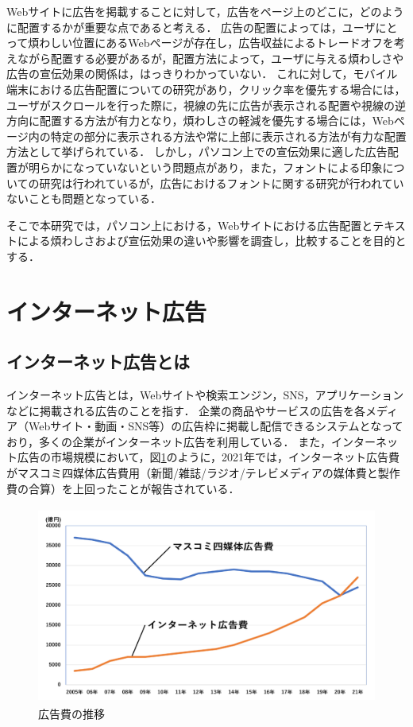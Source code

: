 \documentclass[12pt,a4j,titlepage]{ltjsarticle}
\begin{document}
Webサイトに広告を掲載することに対して，広告をページ上のどこに，どのように配置するかが重要な点であると考える．
広告の配置によっては，ユーザにとって煩わしい位置にあるWebページが存在し，広告収益によるトレードオフを考えながら配置する必要があるが，配置方法によって，ユーザに与える煩わしさや広告の宣伝効果の関係は，はっきりわかっていない．
これに対して，モバイル端末における広告配置についての研究があり，クリック率を優先する場合には，ユーザがスクロールを行った際に，視線の先に広告が表示される配置や視線の逆方向に配置する方法が有力となり，煩わしさの軽減を優先する場合には，Webページ内の特定の部分に表示される方法や常に上部に表示される方法が有力な配置方法として挙げられている\cite{mobile}．
しかし，パソコン上での宣伝効果に適した広告配置が明らかになっていないという問題点があり，また，フォントによる印象についての研究は行われているが，広告におけるフォントに関する研究が行われていないことも問題となっている．

そこで本研究では，パソコン上における，Webサイトにおける広告配置とテキストによる煩わしさおよび宣伝効果の違いや影響を調査し，比較することを目的とする．

\clearpage

\section{インターネット広告}
\subsection{インターネット広告とは}
インターネット広告とは，Webサイトや検索エンジン，SNS，アプリケーションなどに掲載される広告のことを指す．
企業の商品やサービスの広告を各メディア（Webサイト・動画・SNS等）の広告枠に掲載し配信できるシステムとなっており，多くの企業がインターネット広告を利用している．
また，インターネット広告の市場規模において，図\ref{fig:広告費}のように，2021年では，インターネット広告費がマスコミ四媒体広告費用（新聞/雑誌/ラジオ/テレビメディアの媒体費と製作費の合算）を上回ったことが報告されている\cite{dentsu}．

\begin{figure}[h]
\begin{center}
 \includegraphics[height=65mm]{広告費.pdf}
\end{center}
 \caption{広告費の推移}
 \label{fig:広告費}
\end{figure}
\end{document}

